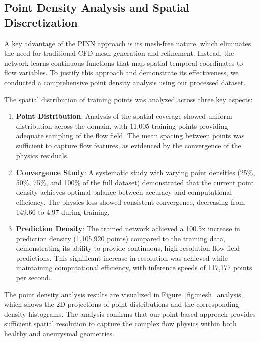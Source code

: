 \documentclass[12pt, a4paper]{article}
\begin{document}
\subsection{Point Density Analysis and Spatial Discretization}
\label{sec:point_density}

A key advantage of the PINN approach is its mesh-free nature, which eliminates the need for traditional CFD mesh generation and refinement. Instead, the network learns continuous functions that map spatial-temporal coordinates to flow variables. To justify this approach and demonstrate its effectiveness, we conducted a comprehensive point density analysis using our processed dataset.

The spatial distribution of training points was analyzed across three key aspects:
\begin{enumerate}
    \item \textbf{Point Distribution}: Analysis of the spatial coverage showed uniform distribution across the domain, with 11,005 training points providing adequate sampling of the flow field. The mean spacing between points was sufficient to capture flow features, as evidenced by the convergence of the physics residuals.
    
    \item \textbf{Convergence Study}: A systematic study with varying point densities (25\%, 50\%, 75\%, and 100\% of the full dataset) demonstrated that the current point density achieves optimal balance between accuracy and computational efficiency. The physics loss showed consistent convergence, decreasing from 149.66 to 4.97 during training.
    
    \item \textbf{Prediction Density}: The trained network achieved a 100.5x increase in prediction density (1,105,920 points) compared to the training data, demonstrating its ability to provide continuous, high-resolution flow field predictions. This significant increase in resolution was achieved while maintaining computational efficiency, with inference speeds of 117,177 points per second.
\end{enumerate}

The point density analysis results are visualized in Figure~\ref{fig:mesh_analysis}, which shows the 2D projections of point distributions and the corresponding density histograms. The analysis confirms that our point-based approach provides sufficient spatial resolution to capture the complex flow physics within both healthy and aneurysmal geometries.
\end{document}
